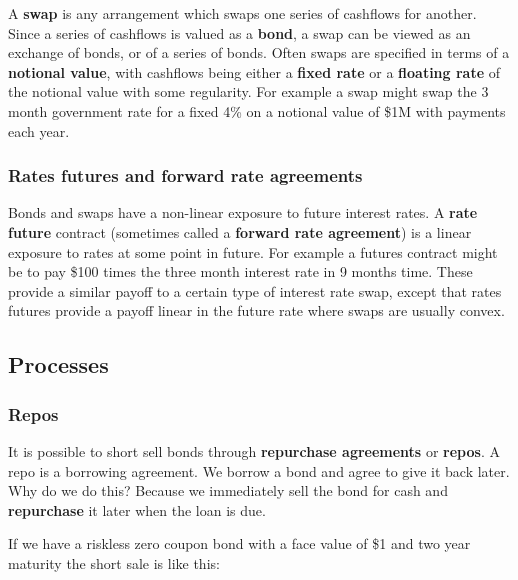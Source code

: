 A \textbf{swap} is any arrangement which swaps one series of cashflows for another. Since a series of cashflows is valued as a \textbf{bond}, a swap can be viewed as an exchange of bonds, or of a series of bonds. Often swaps are specified in terms of a \textbf{notional value}, with cashflows being either a \textbf{fixed rate} or a \textbf{floating rate} of the notional value with some regularity. For example a swap might swap the 3 month government rate for a fixed 4\% on a notional value of \$1M with payments each year. 


\subsubsection{Rates futures and forward rate agreements}
Bonds and swaps have a non-linear exposure to future interest rates. A \textbf{rate future} contract (sometimes called a \textbf{forward rate agreement}) is a linear exposure to rates at some point in future. For example a futures contract might be to pay \$100 times the three month interest rate in 9 months time. These provide a similar payoff to a certain type of interest rate swap, except that rates futures provide a payoff linear in the future rate where swaps are usually convex.


\subsection{Processes}

\subsubsection{Repos}

It is possible to short sell bonds through \textbf{repurchase agreements} or \textbf{repos}. A repo is a borrowing agreement. We borrow a bond and agree to give it back later. Why do we do this? Because we immediately sell the bond for cash and \textbf{repurchase} it later when the loan is due.

If we have a riskless zero coupon bond with a face value of \$1 and two year maturity the short sale is like this:


